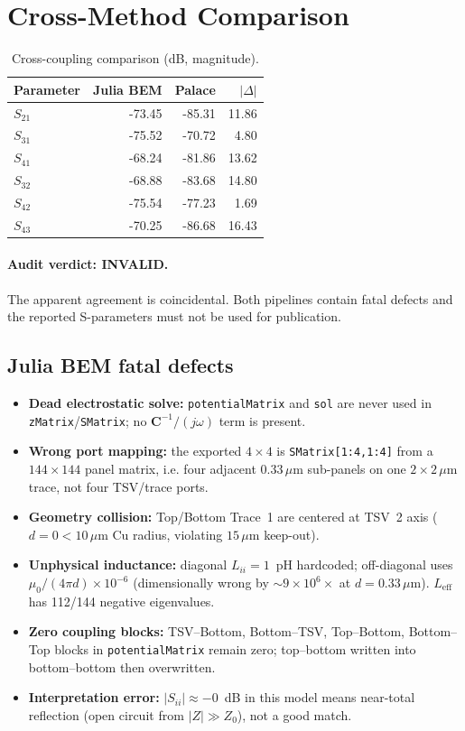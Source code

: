 \documentclass[11pt]{article}
\begin{document}
\section{Cross-Method Comparison}
\begin{table}[h]
\centering
\caption{Cross-coupling comparison (dB, magnitude).}
\label{tab:compare}
\begin{tabular}{lrrr}
\toprule
Parameter & Julia BEM & Palace & $|\Delta|$ \\
\midrule
$S_{21}$ & -73.45 & -85.31 & 11.86 \\
$S_{31}$ & -75.52 & -70.72 & 4.80 \\
$S_{41}$ & -68.24 & -81.86 & 13.62 \\
$S_{32}$ & -68.88 & -83.68 & 14.80 \\
$S_{42}$ & -75.54 & -77.23 & 1.69 \\
$S_{43}$ & -70.25 & -86.68 & 16.43 \\
\bottomrule
\end{tabular}
\end{table}

\paragraph{Audit verdict: INVALID.}
The apparent agreement is coincidental. Both pipelines contain fatal defects and the reported S-parameters must not be used for publication.

\subsection*{Julia BEM fatal defects}
\begin{itemize}
  \item \textbf{Dead electrostatic solve:} \texttt{potentialMatrix} and \texttt{sol} are never used in \texttt{zMatrix}/\texttt{SMatrix}; no $\mathbf{C}^{-1}/(j\omega)$ term is present.
  \item \textbf{Wrong port mapping:} the exported $4\times4$ is \texttt{SMatrix[1:4,1:4]} from a $144\times144$ panel matrix, i.e. four adjacent $0.33\,\mu$m sub-panels on one $2\times2\,\mu$m trace, not four TSV/trace ports.
  \item \textbf{Geometry collision:} Top/Bottom Trace~1 are centered at TSV~2 axis ($d=0<10\,\mu$m Cu radius, violating $15\,\mu$m keep-out).
  \item \textbf{Unphysical inductance:} diagonal $L_{ii}=1$~pH hardcoded; off-diagonal uses $\mu_0/(4\pi d)\times 10^{-6}$ (dimensionally wrong by $\sim 9\times 10^6\times$ at $d=0.33\,\mu$m). $L_{\mathrm{eff}}$ has 112/144 negative eigenvalues.
  \item \textbf{Zero coupling blocks:} TSV--Bottom, Bottom--TSV, Top--Bottom, Bottom--Top blocks in \texttt{potentialMatrix} remain zero; top--bottom written into bottom--bottom then overwritten.
  \item \textbf{Interpretation error:} $|S_{ii}|\approx -0$~dB in this model means near-total reflection (open circuit from $|Z|\gg Z_0$), not a good match.
\end{itemize}
\end{document}

